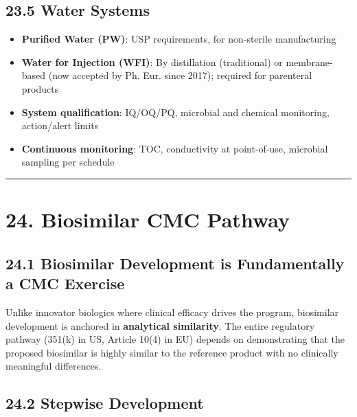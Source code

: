 \documentclass[
  11pt,
  a4paper,
]{report}
\providecommand{\tightlist}{%
  \setlength{\itemsep}{0pt}\setlength{\parskip}{0pt}}
\begin{document}
\hypertarget{water-systems}{%
\subsection{23.5 Water Systems}\label{water-systems}}

\begin{itemize}
\tightlist
\item
  \textbf{Purified Water (PW)}: USP requirements, for non-sterile
  manufacturing
\item
  \textbf{Water for Injection (WFI)}: By distillation (traditional) or
  membrane-based (now accepted by Ph. Eur. since 2017); required for
  parenteral products
\item
  \textbf{System qualification}: IQ/OQ/PQ, microbial and chemical
  monitoring, action/alert limits
\item
  \textbf{Continuous monitoring}: TOC, conductivity at point-of-use,
  microbial sampling per schedule
\end{itemize}

\begin{center}\rule{0.5\linewidth}{0.5pt}\end{center}

\hypertarget{biosimilar-cmc-pathway}{%
\section{24. Biosimilar CMC Pathway}\label{biosimilar-cmc-pathway}}

\hypertarget{biosimilar-development-is-fundamentally-a-cmc-exercise}{%
\subsection{24.1 Biosimilar Development is Fundamentally a CMC
Exercise}\label{biosimilar-development-is-fundamentally-a-cmc-exercise}}

Unlike innovator biologics where clinical efficacy drives the program,
biosimilar development is anchored in \textbf{analytical similarity}.
The entire regulatory pathway (351(k) in US, Article 10(4) in EU)
depends on demonstrating that the proposed biosimilar is highly similar
to the reference product with no clinically meaningful differences.

\hypertarget{stepwise-development}{%
\subsection{24.2 Stepwise Development}\label{stepwise-development}}
\end{document}
